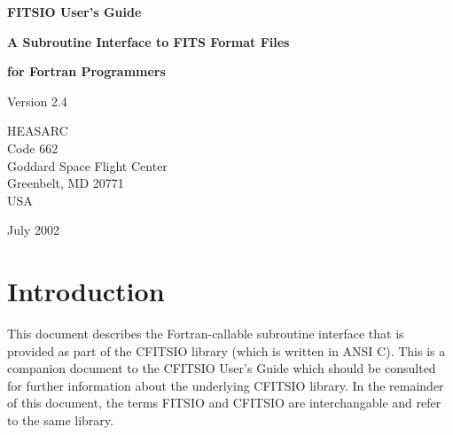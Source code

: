 \documentclass[11pt]{book}
\begin{document}

\begin{titlepage}
\normalsize
\vspace*{4.6cm}
\begin{center}
{\Huge \bf FITSIO User's Guide}\\
\end{center}
\medskip 
\medskip
\begin{center}
{\LARGE \bf A Subroutine Interface to FITS Format Files}\\
\end{center}
\begin{center}
{\LARGE \bf for Fortran Programmers}\\
\end{center}
\medskip
\medskip
\begin{center}
{\Large Version 2.4\\}
\end{center}
\bigskip
\vskip 2.5cm
\begin{center}
{HEASARC\\
Code 662\\
Goddard Space Flight Center\\
Greenbelt, MD 20771\\
USA}
\end{center}

\vfill
\bigskip
\begin{center}
{\Large July 2002\\}
\end{center}
\vfill
\end{titlepage}

\clearpage

\tableofcontents

\chapter{Introduction }

This document describes the Fortran-callable subroutine interface that
is provided as part of the CFITSIO library (which is written in ANSI
C).  This is a companion document to the CFITSIO User's Guide which
should be consulted for further information about the underlying
CFITSIO library.  In the remainder of this document, the terms FITSIO
and CFITSIO are interchangable and refer to the same library.
\end{document}
